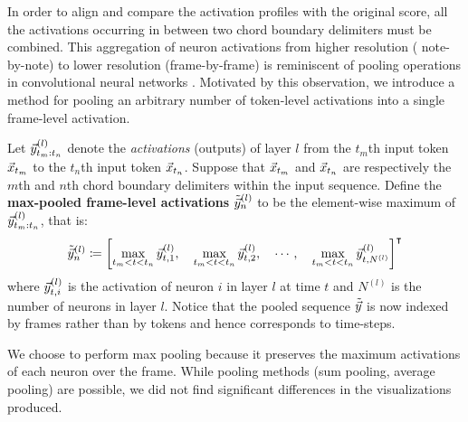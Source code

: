 In order to align and compare the activation profiles with the original score,
all the activations occurring in between two chord boundary delimiters must be
combined. This aggregation of neuron activations from higher resolution (\eg
note-by-note) to lower resolution (\eg frame-by-frame) is reminiscent of
pooling operations in convolutional neural networks
\citep{scherer2010evaluation}. Motivated by this observation, we introduce a
method for pooling an arbitrary number of token-level activations into a single
frame-level activation.

Let $\vec{y}^{(l)}_{{t_m}:{t_n}}$ denote the \emph{activations} (\eg outputs) of
layer $l$ from the $t_m$th input token $\vec{x}_{t_m}$ to the $t_n$th input token
$\vec{x}_{t_n}$. Suppose that $\vec{x}_{t_m}$ and $\vec{x}_{t_n}$ are respectively the $m$th
and $n$th chord boundary delimiters within the input sequence. Define the
\textbf{max-pooled frame-level activations} $\tilde{\vec{y}}^{(l)}_n$ to be the
element-wise maximum of $\vec{y}^{(l)}_{{t_m}:{t_n}}$, that is:
\begin{equation}
    \tilde{\vec{y}}^{(l)}_n \coloneqq \left[
        \max_{t_m < t < t_n} \vec{y}^{(l)}_{t,1},\quad
        \max_{t_m < t < t_n} \vec{y}^{(l)}_{t,2},\quad
        \cdots,\quad
        \max_{t_m < t < t_n} \vec{y}^{(l)}_{t,N^{(l)}}
    \right]^\intercal
\end{equation}
where $\vec{y}^{(l)}_{t,i}$ is the activation of neuron $i$ in layer $l$ at time $t$
and $N^{(l)}$ is the number of neurons in layer $l$. Notice that the pooled
sequence $\tilde{\vec{y}}$ is now indexed by frames rather than by tokens and hence
corresponds to time-steps.

We choose to perform max pooling because it preserves the maximum activations
of each neuron over the frame. While pooling methods (\eg sum pooling, average
pooling) are possible, we did not find significant differences in the
visualizations produced.

